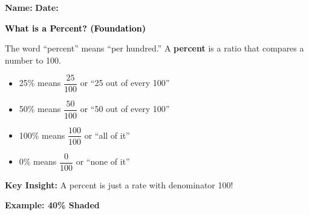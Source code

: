 \documentclass[12pt, letterpaper, fleqn]{article}
\begin{document}
\textbf{Name:} \underline{\hspace{5cm}}
\hfill
\textbf{Date:} \underline{\hspace{3cm}}\\

\begin{tcolorbox}[colback=customteal!20]
    \large\textcolor{black}{\textbf{What is a Percent? (Foundation)}}
\end{tcolorbox}

\vspace{3mm}

\noindent
The word ``percent'' means ``per hundred.'' A \textbf{percent} is a ratio that compares a number to 100.

\begin{itemize}
    \item 25\% means $\dfrac{25}{100}$ or ``25 out of every 100''
    \item 50\% means $\dfrac{50}{100}$ or ``50 out of every 100''
    \item 100\% means $\dfrac{100}{100}$ or ``all of it''
    \item 0\% means $\dfrac{0}{100}$ or ``none of it''
\end{itemize}

\medskip

\noindent
\textbf{Key Insight:} A percent is just a rate with denominator 100!

\vspace{4mm}

\begin{tcolorbox}[colback=white, colframe=black!25, boxrule=0.6pt, arc=4mm, left=6mm, right=6mm, top=5mm, bottom=5mm]

\textbf{Example: 40\% Shaded}

\begin{center}
\end{center}

\end{tcolorbox}
\end{document}
